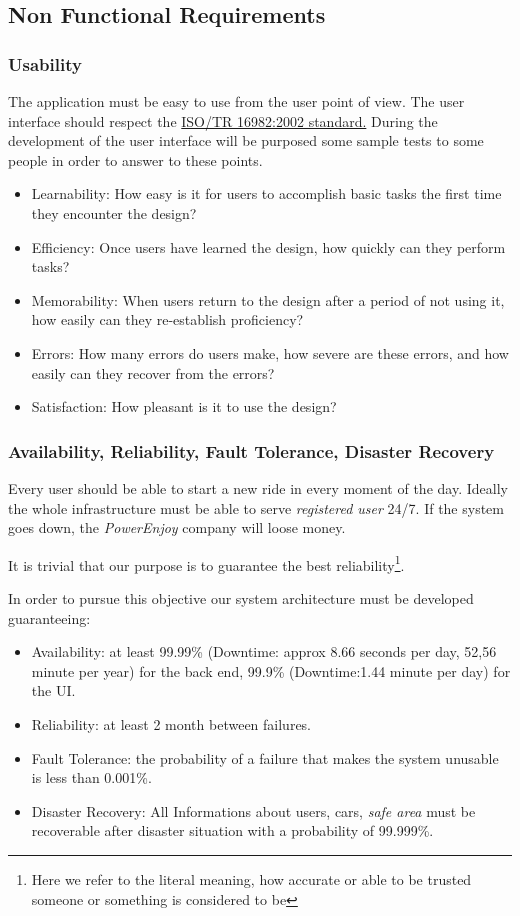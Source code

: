 \documentclass[english]{article}
\newcommand{\powerenjoy}{\textit{PowerEnjoy }}
\newcommand{\registereduser}{\textit {registered user }}
\newcommand{\safearea}{\textit{safe area }}
\begin{document}
	\subsection{Non Functional Requirements}
		\subsubsection{Usability}
		The application must be easy to use from the user point of view. The user interface should respect the \href{https://www.iso.org/obp/ui/#iso:std:iso:tr:16982:ed-1:v1:en}{ISO/TR 16982:2002 standard.} 
During the development of the user interface will be purposed some sample tests to some people in order to answer to these points.
	\begin{itemize}
		\item Learnability: How easy is it for users to accomplish basic tasks the first time they encounter the design?
		\item Efficiency: Once users have learned the design, how quickly can they perform tasks?
		\item Memorability: When users return to the design after a period of not using it, how easily can they re-establish proficiency?
		\item Errors: How many errors do users make, how severe are these errors, and how easily can they recover from the errors?
		\item Satisfaction: How pleasant is it to use the design?
	\end{itemize}
		\subsubsection{Availability, Reliability, Fault Tolerance, Disaster Recovery}
		Every user should be able to start a new ride in every moment of the day. Ideally the whole  infrastructure must be able to serve \registereduser 24/7. If the system goes down, the \powerenjoy company will loose money. \par It is trivial that our purpose is to guarantee the best reliability\footnote{Here we refer to the literal meaning, how accurate or able to be trusted someone or something is considered to be}.\par In order to pursue this objective our system architecture must be developed guaranteeing:
		\begin{itemize}
			\item Availability: at least 99.99\% (Downtime: approx 8.66 seconds per day, 52,56 minute per year) for the back end, 99.9\% (Downtime:1.44 minute per day) for the UI.
			\item Reliability: at least 2 month between failures.
			\item Fault Tolerance: the probability of a failure that makes the system unusable is less than 0.001\%.
			\item Disaster Recovery: All Informations about users, cars, \safearea must be recoverable after disaster situation with a probability of 99.999\%.
		\end{itemize}
\end{document}
